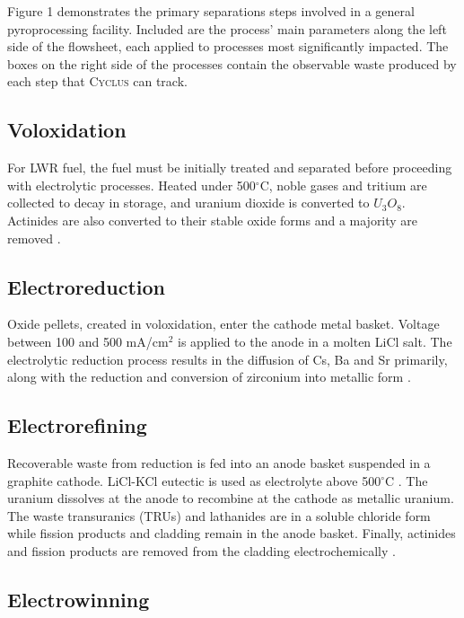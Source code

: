 \documentclass{anstrans}
\newcommand{\Cyclus}{\textsc{Cyclus}\xspace}%
\begin{document}
Figure 1 demonstrates the primary separations steps involved in a general pyroprocessing facility. Included are the process' main parameters along the left side of the flowsheet, each applied to processes most significantly impacted. The boxes on the right side of the processes contain the observable waste produced by each step that \Cyclus can track.

\subsection{Voloxidation}

For LWR fuel, the fuel must be initially treated and separated before proceeding with electrolytic processes. Heated under 500$^{\circ}$C, noble gases and tritium are collected to decay in storage, and uranium dioxide is converted to $U_3O_8$. Actinides are also converted to their stable oxide forms and a majority are removed \cite{flowsheet_1998}. 

\subsection{Electroreduction}

Oxide pellets, created in voloxidation, enter the cathode metal basket. Voltage between 100 and 500 mA/cm$^2$ is applied to the anode in a molten LiCl salt. The electrolytic reduction process results in the diffusion of Cs, Ba and Sr primarily, along with the reduction and conversion of zirconium into metallic form \cite{choi_electrochemical_2015,flowsheet_1998}.

\subsection{Electrorefining}

Recoverable waste from reduction is fed into an anode basket suspended in a graphite cathode. LiCl-KCl eutectic is used as electrolyte above 500$^{\circ}$C \cite{flowsheet_1998,lee_korean_2011}. The uranium dissolves at the anode to recombine at the cathode as metallic uranium. The waste transuranics (TRUs) and lathanides are in a soluble chloride form  while fission products and cladding remain in the anode basket. Finally, actinides and fission products are removed from the cladding electrochemically \cite{lee_korean_2011}.

\subsection{Electrowinning}
\end{document}
